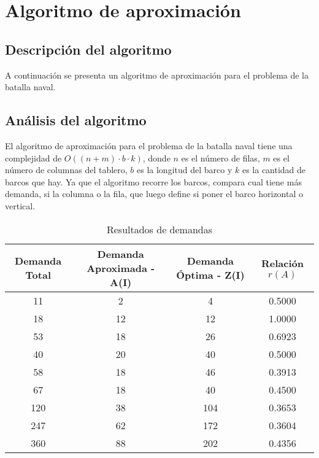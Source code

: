 \section{Algoritmo de aproximación}


\subsection{Descripción del algoritmo}

A continuación se presenta un algoritmo de aproximación para el problema de la batalla naval.



\subsection{Análisis del algoritmo}

El algoritmo de aproximación para el problema de la batalla naval tiene una complejidad de $O((n + m) \cdot b \cdot k)$, donde $n$ es el número de filas, $m$ es el número de columnas del tablero, $b$ es la longitud del barco y $k$ es la cantidad de barcos que hay. Ya que el algoritmo recorre los barcos, compara cual tiene más demanda, si la columna o la fila, que luego define si poner el barco horizontal o vertical. 

\begin{table}[h!]
    \centering
    \caption{Resultados de demandas}
    \label{tab:resultados}
    \begin{tabular}{|c|c|c|c|}
      \hline
      Demanda Total & Demanda Aproximada - A(I) & Demanda Óptima - Z(I) & Relación \( r(A) \) \\ \hline
      11            & 2                         & 4                     & 0.5000             \\ \hline
      18            & 12                        & 12                    & 1.0000             \\ \hline
      53            & 18                        & 26                    & 0.6923             \\ \hline
      40            & 20                        & 40                    & 0.5000             \\ \hline
      58            & 18                        & 46                    & 0.3913             \\ \hline
      67            & 18                        & 40                    & 0.4500             \\ \hline
      120           & 38                        & 104                   & 0.3653             \\ \hline
      247           & 62                        & 172                   & 0.3604             \\ \hline
      360           & 88                        & 202                   & 0.4356             \\ \hline
    \end{tabular}
\end{table}

